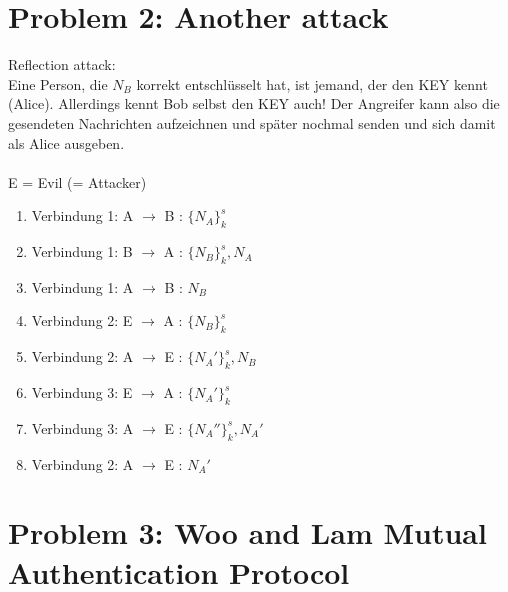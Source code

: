 \documentclass[12pt,pdftex,a4paper]{article}
\newcommand\tab[1][1cm]{\hspace*{#1}}
\begin{document}
\section*{Problem 2: Another attack}
Reflection attack:\\
Eine Person, die $ N_B $ korrekt entschlüsselt hat, ist jemand, der den KEY kennt (Alice). Allerdings kennt Bob selbst den KEY auch! Der Angreifer kann also die gesendeten Nachrichten aufzeichnen und später nochmal senden und sich damit als Alice ausgeben.
\\~\\
E = Evil (= Attacker)
\begin{enumerate}
	\item Verbindung 1: A $ \rightarrow $ B \tab : $ \{N_A\}^s_k $
	\item Verbindung 1: B $ \rightarrow $ A \tab : $ \{N_B\}^s_k, N_A $
	\item Verbindung 1: A $ \rightarrow $ B \tab : $ N_B $
	\setlength{\itemsep}{20pt}
	\item Verbindung 2: E $ \rightarrow $ A \tab : $ \{N_B\}^s_k $
	\setlength{\itemsep}{5pt}
	\item Verbindung 2: A $ \rightarrow $ E \tab : $ \{N_A'\}^s_k, N_B $
	\item Verbindung 3: E $ \rightarrow $ A \tab : $ \{N_A'\}^s_k $
	\item Verbindung 3: A $ \rightarrow $ E \tab : $ \{N_A''\}^s_k, N_A' $
	\item Verbindung 2: A $ \rightarrow $ E \tab : $ N_A' $
\end{enumerate}

\newpage
\section*{Problem 3: Woo and Lam Mutual Authentication Protocol}
\end{document}
